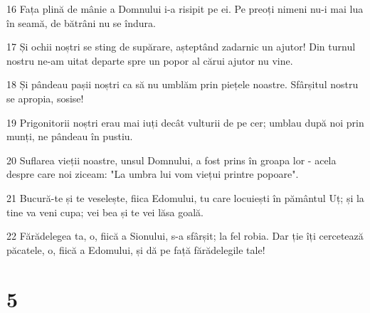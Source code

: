 \par 16 Fața plină de mânie a Domnului i-a risipit pe ei. Pe preoți nimeni nu-i mai lua în seamă, de bătrâni nu se îndura.
\par 17 Și ochii noștri se sting de supărare, așteptând zadarnic un ajutor! Din turnul nostru ne-am uitat departe spre un popor al cărui ajutor nu vine.
\par 18 Și pândeau pașii noștri ca să nu umblăm prin piețele noastre. Sfârșitul nostru se apropia, sosise!
\par 19 Prigonitorii noștri erau mai iuți decât vulturii de pe cer; umblau după noi prin munți, ne pândeau în pustiu.
\par 20 Suflarea vieții noastre, unsul Domnului, a fost prins în groapa lor - acela despre care noi ziceam: "La umbra lui vom viețui printre popoare".
\par 21 Bucură-te și te veselește, fiica Edomului, tu care locuiești în pământul Uț; și la tine va veni cupa; vei bea și te vei lăsa goală.
\par 22 Fărădelegea ta, o, fiică a Sionului, s-a sfârșit; la fel robia. Dar ție îți cercetează păcatele, o, fiică a Edomului, și dă pe față fărădelegile tale!

\chapter{5}


